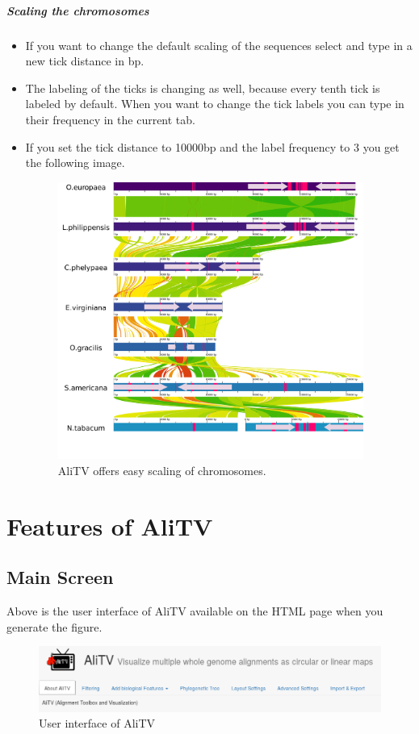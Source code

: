 \documentclass[a4paper]{scrartcl}
\begin{document}
\subparagraph*{Scaling the chromosomes}
\begin{itemize}
	\item If you want to change the default scaling of the sequences select  and type in a new tick distance in bp. 
	\item The labeling of the ticks is changing as well, because every tenth tick is labeled by default. When you want to change the tick labels you can type in their frequency in the current tab.
	\item If you set the tick distance to 10000bp and the label frequency to 3 you get the following image.
	\begin{figure}
		\centering
		\includegraphics[width=10cm]{newLabels.png}
		\caption{AliTV offers easy scaling of chromosomes.}
	\end{figure}
\end{itemize}

\newpage
\section*{Features of AliTV}
\subsection*{Main Screen}
Above is the user interface of AliTV available on the HTML page when you generate the figure.
\begin{figure}[H]
	\centering
	\includegraphics[width=14cm]{userInterface.png}
	\caption{User interface of AliTV}
\end{figure}
\end{document}
